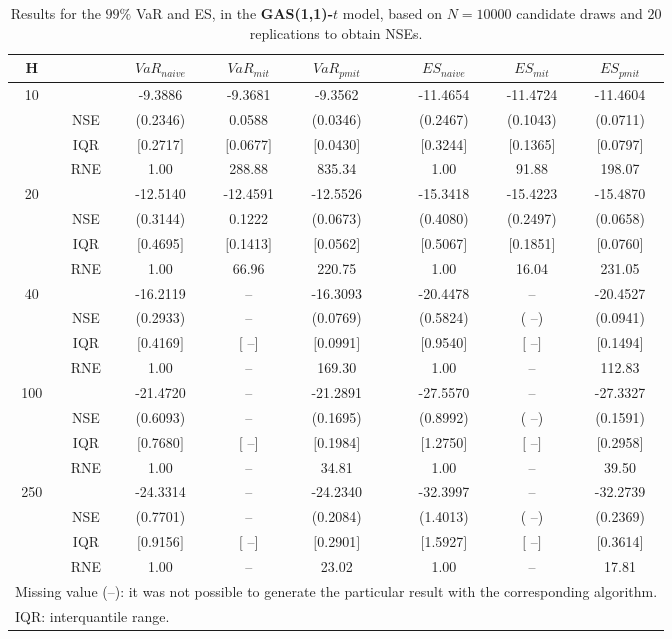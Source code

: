 \footnotesize{  
{ \renewcommand{\arraystretch}{1.3} 
\begin{longtable}{ccccccccc}  
\caption{Results for the $99\%$ VaR and ES, in the \textbf{GAS(1,1)-$t$} model, based on $N=10000$ candidate draws and $20$ replications to obtain NSEs.} 
\label{tab:res_algos_t_gas_ML} \\ 
 H & & $VaR_{naive}$ & $VaR_{mit}$ & $VaR_{pmit}$ &  & $ES_{naive}$ & $ES_{mit}$ & $ES_{pmit}$ \\ \hline 
10 & & -9.3886 & -9.3681 & -9.3562 & & -11.4654 & -11.4724 & -11.4604  \\ 
  & NSE & (0.2346) & 0.0588 & (0.0346) & & (0.2467) & (0.1043) & (0.0711)   \\ 
 & IQR & $[$0.2717$]$ & $[$0.0677$]$ & $[$0.0430$]$ & & $[$0.3244$]$ & $[$0.1365$]$ & $[$0.0797$]$  \\  
  & RNE &   1.00 & 288.88 & 835.34 & &   1.00 &  91.88 & 198.07   \\ [1ex] 
20 & & -12.5140 & -12.4591 & -12.5526 & & -15.3418 & -15.4223 & -15.4870  \\ 
  & NSE & (0.3144) & 0.1222 & (0.0673) & & (0.4080) & (0.2497) & (0.0658)   \\ 
 & IQR & $[$0.4695$]$ & $[$0.1413$]$ & $[$0.0562$]$ & & $[$0.5067$]$ & $[$0.1851$]$ & $[$0.0760$]$  \\  
  & RNE &   1.00 &  66.96 & 220.75 & &   1.00 &  16.04 & 231.05   \\ [1ex] 
40 & & -16.2119 &    -- & -16.3093 & & -20.4478 &    -- & -20.4527  \\ 
  & NSE & (0.2933) &    -- & (0.0769) & & (0.5824) & (   --) & (0.0941)   \\ 
 & IQR & $[$0.4169$]$ & $[$   --$]$ & $[$0.0991$]$ & & $[$0.9540$]$ & $[$   --$]$ & $[$0.1494$]$  \\  
  & RNE &   1.00 &    -- & 169.30 & &   1.00 &    -- & 112.83   \\ [1ex] 
100 & & -21.4720 &    -- & -21.2891 & & -27.5570 &    -- & -27.3327  \\ 
  & NSE & (0.6093) &    -- & (0.1695) & & (0.8992) & (   --) & (0.1591)   \\ 
 & IQR & $[$0.7680$]$ & $[$   --$]$ & $[$0.1984$]$ & & $[$1.2750$]$ & $[$   --$]$ & $[$0.2958$]$  \\  
  & RNE &   1.00 &    -- &  34.81 & &   1.00 &    -- &  39.50   \\ [1ex] 
250 & & -24.3314 &    -- & -24.2340 & & -32.3997 &    -- & -32.2739  \\ 
  & NSE & (0.7701) &    -- & (0.2084) & & (1.4013) & (   --) & (0.2369)   \\ 
 & IQR & $[$0.9156$]$ & $[$   --$]$ & $[$0.2901$]$ & & $[$1.5927$]$ & $[$   --$]$ & $[$0.3614$]$  \\  
  & RNE &   1.00 &    -- &  23.02 & &   1.00 &    -- &  17.81   \\ [1ex] 
\hline 
  \multicolumn{9}{p{10cm}}{\footnotesize{Missing value (--): it was not possible to generate the particular result with the corresponding algorithm.}} \\ 
  \multicolumn{9}{l}{\footnotesize{IQR: interquantile range.}} \\ 
\end{longtable} 
} 
} 
\normalsize 
